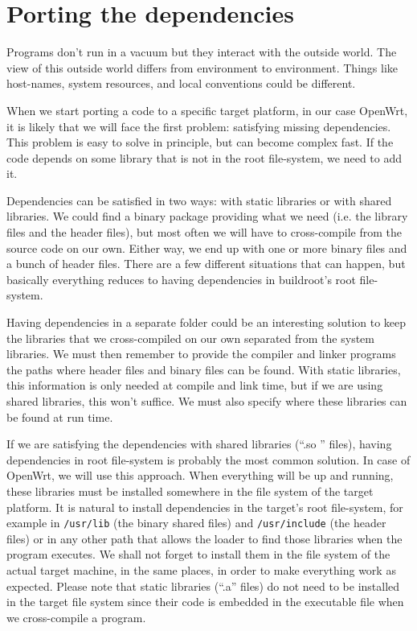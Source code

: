 \chapter{Porting the dependencies}\label{satisfy_dependencies}

Programs don’t run in a vacuum but they interact with the outside world.
The view of this outside world differs from environment to environment.
Things like host-names, system resources, and local conventions could be different.

When we start porting a code to a specific target platform, in our case OpenWrt, it is likely that we will face the first problem: satisfying missing dependencies.
This problem is easy to solve in principle, but can become complex fast.
If the code depends on some library that is not in the root file-system, we need to add it.

Dependencies can be satisfied in two ways: with static libraries or with shared libraries.
We could find a binary package providing what we need (i.e. the library files and the header files), but most often we will have to cross-compile from the source code on our own.
Either way, we end up with one or more binary files and a bunch of header files.
There are a few different situations that can happen, but basically everything reduces to having dependencies in buildroot's root file-system.

Having dependencies in a separate folder could be an interesting solution to keep the libraries that we cross-compiled on our own separated from the system libraries.
We must then remember to provide the compiler and linker programs the paths where header files and binary files can be found.
With static libraries, this information is only needed at compile and link time, but if we are using shared libraries, this won’t suffice.
We must also specify where these libraries can be found at run time.

If we are satisfying the dependencies with shared libraries (“.so ” files), having dependencies in root file-system is probably the most common solution.
In case of OpenWrt, we will use this approach.
When everything will be up and running, these libraries must be installed somewhere in the file system of the target platform.
It is natural to install dependencies in the target's root file-system, for example in {\tt /usr/lib} (the binary shared files) and {\tt /usr/include} (the header files) or in any other path that allows the loader to find those libraries when the program executes.
We shall not forget to install them in the file system of the actual target machine, in the same places, in order to make everything work as expected.
Please note that static libraries (“.a” files) do not need to be installed in the target file system since their code is embedded in the executable file when we cross-compile a program\cite{fabrizio}.



